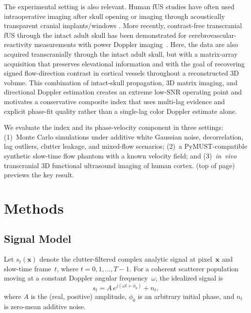 \documentclass[11pt]{article}
\begin{document}
The experimental setting is also relevant.  Human fUS studies have
often used intraoperative imaging after skull opening
\cite{imbault2017intraoperative} or imaging through acoustically
transparent cranial implants/windows
\cite{rabut2024cranialwindow,soloukey2025mobile}.  More recently,
contrast-free transcranial fUS through the intact adult skull has been
demonstrated for cerebrovascular-reactivity measurements with power
Doppler imaging~\cite{vienneau2026adultskull}.  Here, the data are
also acquired transcranially through the intact adult skull, but with a
matrix-array acquisition that preserves elevational information and
with the goal of recovering signed flow-direction contrast in cortical
vessels throughout a reconstructed 3D volume.  This combination of
intact-skull propagation, 3D matrix imaging, and directional Doppler
estimation creates an extreme low-SNR operating point and motivates a
conservative composite index that uses multi-lag evidence and explicit
phase-fit quality rather than a single-lag color Doppler estimate
alone.

We evaluate the index and its phase-velocity component in three
settings: (1)~Monte Carlo simulations under additive white Gaussian
noise, decorrelation, lag outliers, clutter leakage, and mixed-flow
scenarios; (2)~a PyMUST-compatible synthetic slow-time flow phantom
with a known velocity field; and (3)~\textit{in~vivo} transcranial 3D
functional ultrasound imaging of human cortex.
 (top of page) previews the key result.


\section{Methods}
\label{sec:methods}

\subsection{Signal Model}
\label{sec:signal_model}

Let $s_t(\bm{x})$ denote the clutter-filtered complex analytic signal
at pixel~$\bm{x}$ and slow-time frame~$t$, where $t = 0, 1, \ldots,
T{-}1$.  For a coherent scatterer population moving at a constant
Doppler angular frequency~$\omega$, the idealized signal is
\begin{equation}
  s_t = A \, e^{j(\omega t + \phi_0)} + n_t,
  \label{eq:signal_model}
\end{equation}
where $A$ is the (real, positive) amplitude, $\phi_0$ is an arbitrary
initial phase, and $n_t$ is zero-mean additive noise.
\end{document}
